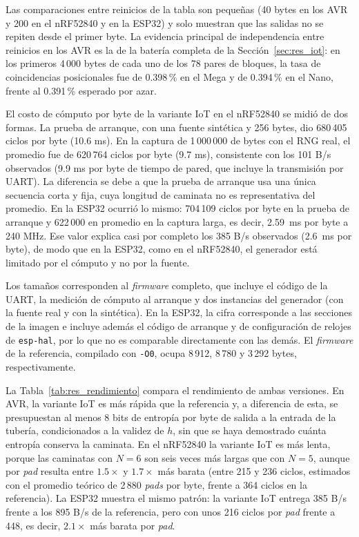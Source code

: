 Las comparaciones entre reinicios de la tabla son pequeñas (40 bytes en los AVR y 200 en el nRF52840 y en la ESP32) y solo muestran que las salidas no se repiten desde el primer byte. La evidencia principal de independencia entre reinicios en los AVR es la de la batería completa de la Sección~\ref{sec:res_iot}: en los primeros 4\,000 bytes de cada uno de los 78 pares de bloques, la tasa de coincidencias posicionales fue de 0.398\,\% en el Mega y de 0.394\,\% en el Nano, frente al 0.391\,\% esperado por azar.

El costo de cómputo por byte de la variante IoT en el nRF52840 se midió de dos formas. La prueba de arranque, con una fuente sintética y 256 bytes, dio 680\,405 ciclos por byte (10.6 ms). En la captura de 1\,000\,000 de bytes con el RNG real, el promedio fue de 620\,764 ciclos por byte (9.7 ms), consistente con los 101 B/s observados (9.9 ms por byte de tiempo de pared, que incluye la transmisión por UART). La diferencia se debe a que la prueba de arranque usa una única secuencia corta y fija, cuya longitud de caminata no es representativa del promedio. En la ESP32 ocurrió lo mismo: 704\,109 ciclos por byte en la prueba de arranque y 622\,000 en promedio en la captura larga, es decir, 2.59~ms por byte a 240 MHz. Ese valor explica casi por completo los 385 B/s observados (2.6~ms por byte), de modo que en la ESP32, como en el nRF52840, el generador está limitado por el cómputo y no por la fuente.

Los tamaños corresponden al \textit{firmware} completo, que incluye el código de la UART, la medición de cómputo al arranque y dos instancias del generador (con la fuente real y con la sintética). En la ESP32, la cifra corresponde a las secciones de la imagen e incluye además el código de arranque y de configuración de relojes de \texttt{esp-hal}, por lo que no es comparable directamente con las demás. El \textit{firmware} de la referencia, compilado con \texttt{-O0}, ocupa 8\,912, 8\,780 y 3\,292 bytes, respectivamente.

La Tabla~\ref{tab:res_rendimiento} compara el rendimiento de ambas versiones. En AVR, la variante IoT es más rápida que la referencia y, a diferencia de esta, se presupuestan al menos 8 bits de entropía por byte de salida a la entrada de la tubería, condicionados a la validez de $h$, sin que se haya demostrado cuánta entropía conserva la caminata. En el nRF52840 la variante IoT es más lenta, porque las caminatas con $N = 6$ son seis veces más largas que con $N = 5$, aunque por \textit{pad} resulta entre $1.5\times$ y $1.7\times$ más barata (entre 215 y 236 ciclos, estimados con el promedio teórico de 2\,880 \textit{pads} por byte, frente a 364 ciclos en la referencia). La ESP32 muestra el mismo patrón: la variante IoT entrega 385 B/s frente a los 895 B/s de la referencia, pero con unos 216 ciclos por \textit{pad} frente a 448, es decir, $2.1\times$ más barata por \textit{pad}.

